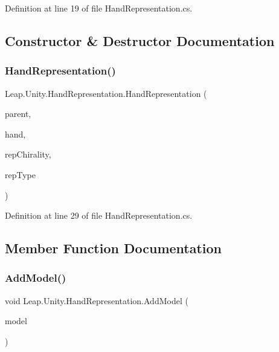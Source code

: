 Definition at line 19 of file Hand\+Representation.\+cs.



\subsection{Constructor \& Destructor Documentation}
\mbox{\label{class_leap_1_1_unity_1_1_hand_representation_a822064352dc70ceac75f76f454f633ea}} 
\subsubsection{\texorpdfstring{HandRepresentation()}{HandRepresentation()}}
{\footnotesize\ttfamily Leap.\+Unity.\+Hand\+Representation.\+Hand\+Representation (\begin{DoxyParamCaption}\item[{\mbox{\hyperlink{class_leap_1_1_unity_1_1_hand_model_manager}{Hand\+Model\+Manager}}}]{parent,  }\item[{\mbox{\hyperlink{class_leap_1_1_hand}{Hand}}}]{hand,  }\item[{\mbox{\hyperlink{namespace_leap_1_1_unity_a4d15adcf20ba121b2cd9c07f503b606f}{Chirality}}}]{rep\+Chirality,  }\item[{\mbox{\hyperlink{namespace_leap_1_1_unity_a186e5eb0a2b743f1f6b79346f0ab8ad0}{Model\+Type}}}]{rep\+Type }\end{DoxyParamCaption})}



Definition at line 29 of file Hand\+Representation.\+cs.



\subsection{Member Function Documentation}
\mbox{\label{class_leap_1_1_unity_1_1_hand_representation_ac21a6875139515363a4cd1ef206568b8}} 
\subsubsection{\texorpdfstring{AddModel()}{AddModel()}}
{\footnotesize\ttfamily void Leap.\+Unity.\+Hand\+Representation.\+Add\+Model (\begin{DoxyParamCaption}\item[{\mbox{\hyperlink{class_leap_1_1_unity_1_1_hand_model_base}{Hand\+Model\+Base}}}]{model }\end{DoxyParamCaption})}



